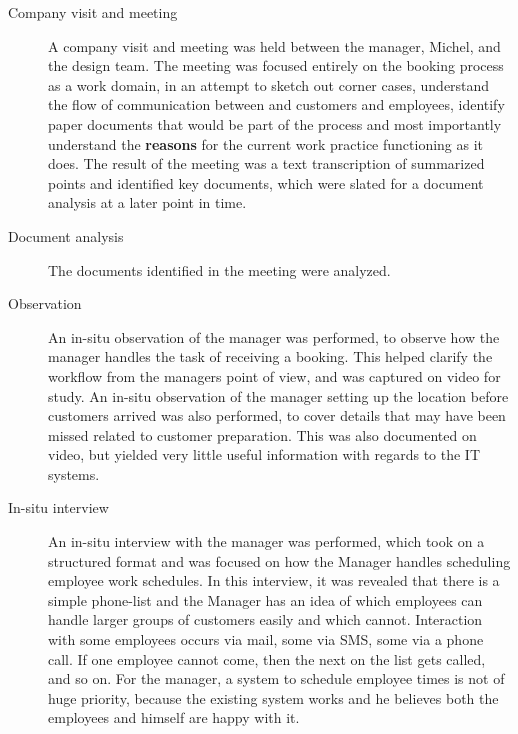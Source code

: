 \begin{description}
    \item [Company visit and meeting] A company visit and meeting was held
        between the manager, Michel, and the design team. The meeting was
        focused entirely on the booking process as a work domain, in an attempt
        to sketch out corner cases, understand the flow of communication between
        \gomonkey{} and customers and employees, identify paper documents that
        would be part of the process and most importantly understand the
        \textbf{reasons} for the current work practice functioning as it does.
        The result of the meeting was a text transcription of summarized points
        and identified key documents, which were slated for a document analysis
        at a later point in time. 

    \item [Document analysis] The documents identified in the meeting were
        analyzed. 

    \item [Observation] An in-situ observation of the manager was performed,
        to observe how the manager handles the task of receiving a booking. This
        helped clarify the workflow from the managers point of view, and was
        captured on video for study. An in-situ observation of the manager
        setting up the location before customers arrived was also performed, to
        cover details that may have been missed related to customer preparation.
        This was also documented on video, but yielded very little useful
        information with regards to the IT systems.

    \item [In-situ interview] An in-situ interview with the manager was
        performed, which took on a structured format and was focused on how the
        Manager handles scheduling employee work schedules. In this interview,
        it was revealed that there is a simple phone-list and the Manager has an
        idea of which employees can handle larger groups of customers easily and
        which cannot. Interaction with some employees occurs via mail, some via
        SMS, some via a phone call. If one employee cannot come, then the next
        on the list gets called, and so on. For the manager, a system to
        schedule employee times is not of huge priority, because the existing
        system works and he believes both the employees and himself are happy
        with it.


\end{description}
